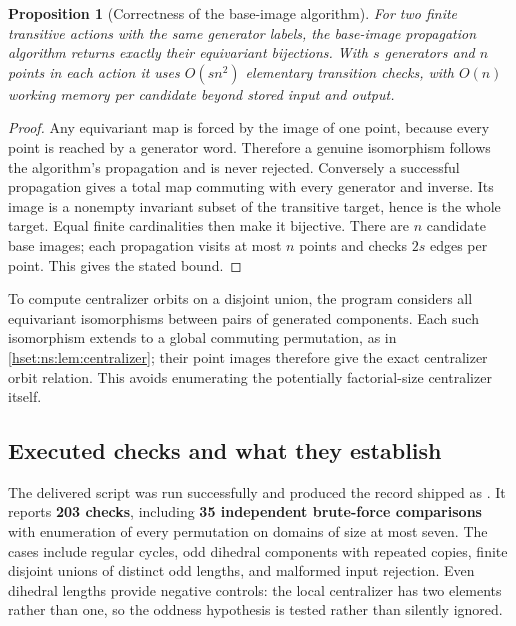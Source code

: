 \documentclass[11pt,letterpaper]{article}
\newtheorem{proposition}[proposition]{Proposition}\aliascntresetthe{proposition}
\theoremstyle{definition}
\theoremstyle{remark}
\begin{document}
\begin{proposition}[Correctness of the base-image algorithm]\label{hset:ns:prop:algorithm}
For two finite transitive actions with the same generator labels, the base-image propagation algorithm returns exactly their equivariant bijections. With $s$ generators and $n$ points in each action it uses $O(sn^2)$ elementary transition checks, with $O(n)$ working memory per candidate beyond stored input and output.
\end{proposition}
\begin{proof}
Any equivariant map is forced by the image of one point, because every point is reached by a generator word. Therefore a genuine isomorphism follows the algorithm's propagation and is never rejected. Conversely a successful propagation gives a total map commuting with every generator and inverse. Its image is a nonempty invariant subset of the transitive target, hence is the whole target. Equal finite cardinalities then make it bijective. There are $n$ candidate base images; each propagation visits at most $n$ points and checks $2s$ edges per point. This gives the stated bound.
\end{proof}

To compute centralizer orbits on a disjoint union, the program considers all equivariant isomorphisms between pairs of generated components. Each such isomorphism extends to a global commuting permutation, as in \cref{hset:ns:lem:centralizer}; their point images therefore give the exact centralizer orbit relation. This avoids enumerating the potentially factorial-size centralizer itself.

\subsection{Executed checks and what they establish}
The delivered script was run successfully and produced the record shipped as . It reports \textbf{203 checks}, including \textbf{35 independent brute-force comparisons} with enumeration of every permutation on domains of size at most seven. The cases include regular cycles, odd dihedral components with repeated copies, finite disjoint unions of distinct odd lengths, and malformed input rejection. Even dihedral lengths provide negative controls: the local centralizer has two elements rather than one, so the oddness hypothesis is tested rather than silently ignored.
\end{document}
